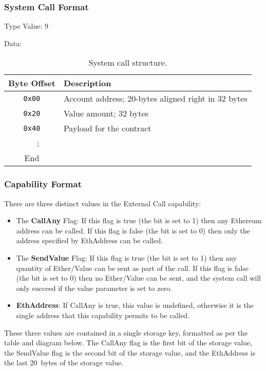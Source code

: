 \documentclass[english,a4paper]{article}
\let\oldparagraph\subsubsection
\renewcommand{\subsubsection}[1]{\oldparagraph{#1}\mbox{}}
\begin{document}
\subsubsection{System Call Format}
Type Value: 9

Data:

\begin{table}[H]
  \caption{System call structure.}
  \centering{}%
  \begin{tabularx}{\textwidth}{c|X}
    \hline
    Byte Offset & Description\\
    \hline
    \hline
    \texttt{0x00} & Account address; 20-bytes aligned right in 32 bytes \\
    \texttt{0x20} & Value amount; 32 bytes \\
    \texttt{0x40} & Payload for the contract \\
    ~~~$\vdots$ & \\
    \hline
    End &  \\
    \hline
  \end{tabularx}
\end{table}

\subsubsection{Capability Format}
There are three distinct values in the External Call capability:

\begin{itemize}
  \item The \textbf{CallAny} Flag: If this flag is true (the bit is set to 1)
    then any Ethereum address can be called. If this flag is false (the bit is
    set to 0) then only the address specified by EthAddress can be called.
  \item The \textbf{SendValue} Flag: If this flag is true (the bit is set to 1)
    then any quantity of Ether/Value can be sent as part of the call. If this
    flag is false (the bit is set to 0) then no Ether/Value can be sent, and the
    system call will only succeed if the value parameter is set to zero.
  \item \textbf{EthAddress}: If CallAny is true, this value is undefined,
  otherwise it is the single address that this capability permits to be called.
\end{itemize}

These three values are contained in a single storage key, formatted as per the
table and diagram below. The CallAny flag is the first bit of the storage value,
the SendValue flag is the second bit of the storage value, and the EthAddress is
the last 20~bytes of the storage value.
\end{document}

